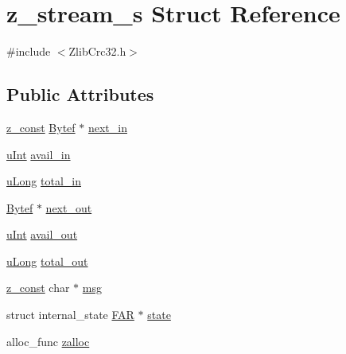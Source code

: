 \hypertarget{structz__stream__s}{}\section{z\+\_\+stream\+\_\+s Struct Reference}
\label{structz__stream__s}


{\ttfamily \#include $<$Zlib\+Crc32.\+h$>$}

\subsection*{Public Attributes}
\begin{DoxyCompactItemize}
\item 
\mbox{\hyperlink{ZlibCrc32_8h_a8dc97a57ad456f3016c710ee6507dbee}{z\+\_\+const}} \mbox{\hyperlink{ZlibCrc32_8h_aeb722a888064be47e12d05f692e0f407}{Bytef}} $\ast$ \mbox{\hyperlink{structz__stream__s_a71613678076af3a9a4bb28d51a146150}{next\+\_\+in}}
\item 
\mbox{\hyperlink{ZlibCrc32_8h_a87d141052bcd5ec8a80812a565c70369}{u\+Int}} \mbox{\hyperlink{structz__stream__s_a0cf177f50dbb49692f27480cbcfde794}{avail\+\_\+in}}
\item 
\mbox{\hyperlink{ZlibCrc32_8h_acd2a5701a3aecf6700d2c66c606ecb40}{u\+Long}} \mbox{\hyperlink{structz__stream__s_aa8f408b9632737dc21519fa1ed34b08d}{total\+\_\+in}}
\item 
\mbox{\hyperlink{ZlibCrc32_8h_aeb722a888064be47e12d05f692e0f407}{Bytef}} $\ast$ \mbox{\hyperlink{structz__stream__s_aed4a02cfe93e975314fed50b04427bf3}{next\+\_\+out}}
\item 
\mbox{\hyperlink{ZlibCrc32_8h_a87d141052bcd5ec8a80812a565c70369}{u\+Int}} \mbox{\hyperlink{structz__stream__s_a45ad2364307af9d944fd39d4eca3ca3c}{avail\+\_\+out}}
\item 
\mbox{\hyperlink{ZlibCrc32_8h_acd2a5701a3aecf6700d2c66c606ecb40}{u\+Long}} \mbox{\hyperlink{structz__stream__s_abae26f1f236cf920250b9d37fdf009c1}{total\+\_\+out}}
\item 
\mbox{\hyperlink{ZlibCrc32_8h_a8dc97a57ad456f3016c710ee6507dbee}{z\+\_\+const}} char $\ast$ \mbox{\hyperlink{structz__stream__s_af116e1f45cb4399c0568b23b3e8b8c16}{msg}}
\item 
struct internal\+\_\+state \mbox{\hyperlink{ZlibCrc32_8h_aef060b3456fdcc093a7210a762d5f2ed}{F\+AR}} $\ast$ \mbox{\hyperlink{structz__stream__s_ac4a114217a1868dc6fbe7d1f5bda126b}{state}}
\item 
alloc\+\_\+func \mbox{\hyperlink{structz__stream__s_a23a2299c384f808e76e9908f21216b0f}{zalloc}}

\end{DoxyCompactItemize}
